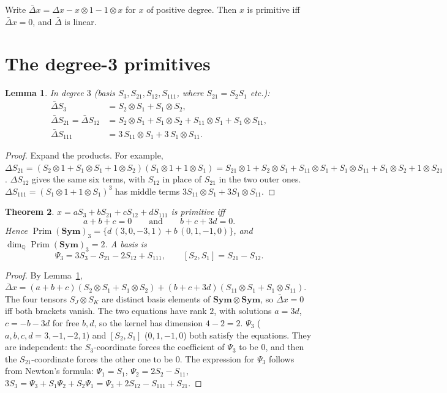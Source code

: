 \documentclass[11pt]{article}
\newtheorem{theorem}{Theorem}
\newtheorem{lemma}[theorem]{Lemma}
\theoremstyle{remark}
\newcommand{\NSym}{\mathbf{Sym}}
\newcommand{\Prim}{\operatorname{Prim}}
\begin{document}
Write $\bar\Delta x=\Delta x-x\otimes1-1\otimes x$ for $x$ of positive degree. Then
$x$ is primitive iff $\bar\Delta x=0$, and $\bar\Delta$ is linear.

\section{\texorpdfstring{The degree-3 primitives}{The degree-3 primitives}}

\begin{lemma}\label{lem:coprod}
In degree $3$ (basis $S_3,S_{21},S_{12},S_{111}$, where $S_{21}=S_2S_1$ etc.):
\begin{align*}
\bar\Delta S_3&=S_2\otimes S_1+S_1\otimes S_2,\\
\bar\Delta S_{21}=\bar\Delta S_{12}&=S_2\otimes S_1+S_1\otimes S_2+S_{11}\otimes S_1+S_1\otimes S_{11},\\
\bar\Delta S_{111}&=3\,S_{11}\otimes S_1+3\,S_1\otimes S_{11}.
\end{align*}
\end{lemma}
\begin{proof}
Expand the products. For example,
$\Delta S_{21}=(S_2\otimes1+S_1\otimes S_1+1\otimes S_2)(S_1\otimes1+1\otimes S_1)
=S_{21}\otimes1+S_2\otimes S_1+S_{11}\otimes S_1+S_1\otimes S_{11}+S_1\otimes S_2+1\otimes S_{21}$.
$\Delta S_{12}$ gives the same six terms, with $S_{12}$ in place of $S_{21}$ in the two outer ones.
$\Delta S_{111}=(S_1\otimes1+1\otimes S_1)^3$ has middle terms $3S_{11}\otimes S_1+3S_1\otimes S_{11}$.
\end{proof}

\begin{theorem}\label{thm:main}
$x=aS_3+bS_{21}+cS_{12}+dS_{111}$ is primitive iff
\[
a+b+c=0\qquad\text{and}\qquad b+c+3d=0 .
\]
Hence $\Prim(\NSym)_3=\{d\,(3,0,-3,1)+b\,(0,1,-1,0)\}$, and
$\dim_{\mathbb Q}\Prim(\NSym)_3=2$. A basis is
\[
\Psi_3=3S_3-S_{21}-2S_{12}+S_{111},\qquad [S_2,S_1]=S_{21}-S_{12}.
\]
\end{theorem}
\begin{proof}
By Lemma~\ref{lem:coprod},
$\bar\Delta x=(a+b+c)(S_2\otimes S_1+S_1\otimes S_2)+(b+c+3d)(S_{11}\otimes S_1+S_1\otimes S_{11})$.
The four tensors $S_J\otimes S_K$ are distinct basis elements of $\NSym\otimes\NSym$,
so $\bar\Delta x=0$ iff both brackets vanish. The two equations have
rank $2$, with solutions $a=3d$, $c=-b-3d$ for free $b,d$, so the kernel has dimension
$4-2=2$. $\Psi_3$ ($a,b,c,d=3,-1,-2,1$) and $[S_2,S_1]$ ($0,1,-1,0$) both satisfy the
equations. They are independent: the $S_3$-coordinate forces the coefficient of
$\Psi_3$ to be $0$, and then the $S_{21}$-coordinate forces the other one to be $0$.
The expression for $\Psi_3$ follows from Newton's formula: $\Psi_1=S_1$, $\Psi_2=2S_2-S_{11}$,
$3S_3=\Psi_3+S_1\Psi_2+S_2\Psi_1=\Psi_3+2S_{12}-S_{111}+S_{21}$.
\end{proof}
\end{document}
